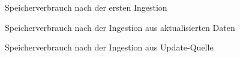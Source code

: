 \begin{figure}
    \centering
    \label{fig:eval-storage-i}
    
    \caption{Speicherverbrauch nach der ersten Ingestion}
\end{figure}

\begin{figure}
    \centering
    \label{fig:eval-storage-u}
    
    \caption{Speicherverbrauch nach der Ingestion aus aktualisierten Daten}
\end{figure}

\begin{figure}
    \centering
    \label{fig:eval-storage-c}
    
    \caption{Speicherverbrauch nach der Ingestion aus Update-Quelle}
\end{figure}